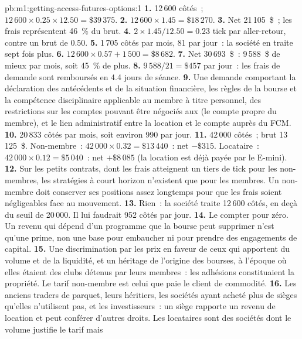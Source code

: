 \begin{solution}{pb:m1:getting-access-futures-options:1}
\textbf{1.} 12\,600 côtés~; $12\,600 \times 0.25 \times 12.50 = \$39\,375$.
\textbf{2.} $12\,600 \times 1.45 = \$18\,270$.
\textbf{3.} Net 21\,105~\$~; les frais représentent 46~\% du brut.
\textbf{4.} $2 \times 1.45/12.50 = 0.23$ tick par aller-retour, contre un brut de
0.50.
\textbf{5.} 1\,705 côtés par mois, 81 par jour~: la société en traite sept fois plus.
\textbf{6.} $12\,600 \times 0.57 + 1\,500 = \$8\,682$.
\textbf{7.} Net 30\,693~\$~: 9\,588~\$ de mieux par mois, soit 45~\% de plus.
\textbf{8.} $9\,588/21 = \$457$ par jour~: les frais de demande sont remboursés en 4.4
jours de séance.
\textbf{9.} Une demande comportant la déclaration des antécédents et de la situation financière, les
règles de la bourse et la compétence disciplinaire applicable au membre à titre personnel, des
restrictions sur les comptes pouvant être négociés aux  (le compte propre
du membre), et le lien administratif entre la location et le
compte auprès du FCM.
\textbf{10.} 20\,833 côtés par mois, soit environ 990 par jour.
\textbf{11.} 42\,000 côtés~; brut 13\,125~\$. Non-membre~: $42\,000 \times 0.32 =
\$13\,440$~: net $-\$315$. Locataire~: $42\,000 \times 0.12 = \$5\,040$~: net
$+\$8\,085$ (la location est déjà payée par le E-mini).
\textbf{12.} Sur les petits contrats, dont les frais atteignent un tiers de tick pour les
non-membres, les stratégies à court horizon n'existent que pour les membres. Un non-membre
doit conserver ses positions assez longtemps pour que les frais soient négligeables face au mouvement.
\textbf{13.} Rien~: la société traite 12\,600 côtés, en deçà du seuil de
20\,000. Il lui faudrait 952 côtés par jour.
\textbf{14.} Le compter pour zéro. Un revenu qui dépend d'un programme que la bourse peut
supprimer n'est qu'une prime, non une base pour embaucher ni pour prendre des engagements de capital.
\textbf{15.} Une discrimination par les prix en faveur de ceux qui apportent du volume et
de la liquidité, et un héritage de l'origine des bourses, à l'époque où elles étaient des clubs détenus par leurs membres~:
les adhésions constituaient la propriété. Le tarif non-membre est celui que paie le client
de commodité.
\textbf{16.} Les anciens traders de parquet, leurs héritiers, les sociétés ayant acheté plus de
sièges qu'elles n'utilisent pas, et les investisseurs~: un siège rapporte un revenu de location et
peut conférer d'autres droits. Les locataires sont des sociétés dont le volume justifie le tarif mais

\end{solution}

